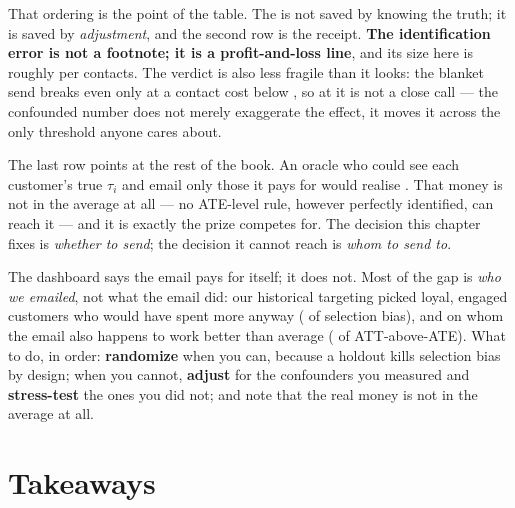 That ordering is the point of the table. The \eur{\nbZeroPolBurn} is not saved by knowing the
truth; it is saved by \emph{adjustment}, and the second row is the receipt. \textbf{The
identification error is not a footnote; it is a profit-and-loss line}, and its size here is
roughly \eur{\nbZeroPolBurn} per \nbZeroNCustomers{} contacts. The verdict is also less fragile
than it looks: the blanket send breaks even only at a contact cost below
\eur{\nbZeroBreakevenCost}, so at \eur{\nbZeroCost} it is not a close call --- the confounded
number does not merely exaggerate the effect, it moves it across the only threshold anyone cares
about.

The last row points at the rest of the book. An oracle who could see each customer's true
$\tau_i$ and email only those it pays for would realise \eur{\nbZeroPolOracle}. That money is not
in the average at all --- no ATE-level rule, however perfectly identified, can reach it --- and it
is exactly the prize  competes for. The decision this chapter fixes is \emph{whether
to send}; the decision it cannot reach is \emph{whom to send to}.

\begin{remark}
The dashboard says the email pays for itself; it does not. Most of the gap is \emph{who we
emailed}, not what the email did: our historical targeting picked loyal, engaged customers who
would have spent more anyway (\eur{\nbZeroSelBias} of selection bias), and on whom the email also
happens to work better than average (\eur{\nbZeroTargetingGap} of ATT-above-ATE). What to do, in
order: \textbf{randomize} when you can, because a holdout kills selection bias by design; when you
cannot, \textbf{adjust} for the confounders you measured and \textbf{stress-test} the ones you did
not; and note that the real money is not in the average at all.
\end{remark}

\section{Takeaways}
\label{sec:fnd:take}

